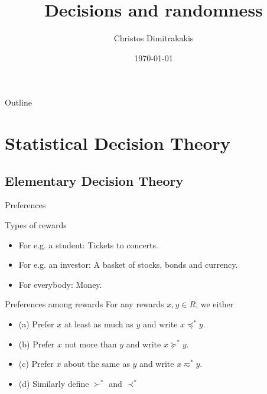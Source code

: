 \documentclass[smaller]{beamer}
\author{Christos Dimitrakakis}
\date{\today}
\title{Decisions and randomness}
\begin{document}
\maketitle
\begin{frame}{Outline}
\tableofcontents
\end{frame}


\section{Statistical Decision Theory}
\label{sec:org0c6936c}
\subsection{Elementary Decision Theory}
\label{sec:org2b4d538}
\begin{frame}[label={sec:org7824971}]{Preferences}
\begin{block}{Types of rewards}
\begin{itemize}
\item For e.g. a student: Tickets to concerts.
\item For e.g. an investor: A basket of stocks, bonds and currency.
\item For everybody: Money.
\end{itemize}
\end{block}

\begin{block}{Preferences among rewards}
For any rewards \(x, y \in R\), we either
\begin{itemize}
\item (a) Prefer \(x\) at least as much as \(y\) and write \(x \preceq^* y\).
\item (b) Prefer \(x\) not more than \(y\) and write \(x \succeq^* y\).
\item (c) Prefer \(x\) about the same as \(y\) and write \(x \eqsim^* y\).
\item (d) Similarly define \(\succ^*\) and \(\prec^*\)
\end{itemize}
\end{block}
\end{frame}
\end{document}
